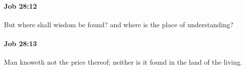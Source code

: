 		\paragraph{Job 28:12} %
			\label{JOB-28-12}

			But where shall wisdom be found? and where is the place of understanding?


		\paragraph{Job 28:13} %
			\label{JOB-28-13}

			Man knoweth not the price thereof; neither is it found in the land of the living.


